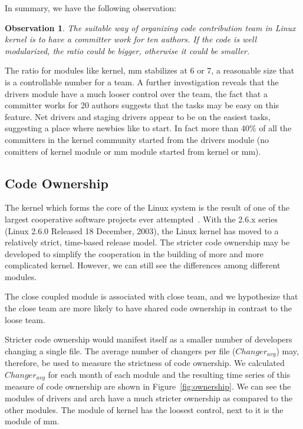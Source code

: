 \documentclass{sig-alternate-05-2015}
\newtheorem{observation}{\bf Observation}
\begin{document}
In summary, we have the following observation:
\begin{observation}\label{o:1}
 The suitable way of organizing code contribution team in Linux kernel is
to have a committer work for ten authors. If the code is well modularized,
the ratio could be bigger, otherwise it could be smaller.
\end{observation}

The ratio for modules like kernel, mm stabilizes at 6 or 7, a reasonable %
size that is a controllable number for a team.
A further investigation reveals that the drivers module have a much looser control over
the team, the fact that a committer works for 20 authors suggests that the tasks
may be easy on this feature. Net drivers and staging drivers appear to be on
the easiest tasks, suggesting a place where newbies like to start.
In fact more than 40\% of all the committers in the kernel community
started from the drivers module (no comitters of kernel module or mm module started from kernel or mm).

\subsection{Code Ownership}
 The kernel which forms the core of the Linux system is the result
of one of the largest cooperative software
projects ever attempted~\cite{kerneldvp}.
With the 2.6.x series (Linux 2.6.0 Released 18 December, 2003), the Linux kernel has moved to a relatively
strict,  time-based  release  model.
The stricter code ownership may be developed to simplify the cooperation
in the building of more and more complicated kernel.
However, we can still see the differences among different modules.

The close coupled module is associated with close team, and we hypothesize
that the close team are more likely to have shared code ownership in contrast
to the loose team.

Stricter code ownership would manifest itself as a smaller number of
developers changing a single file. The average number of changers
per file ($Changer_{avg}$) may, therefore, be used to measure the
strictness of code ownership. We calculated $Changer_{avg}$ for each
month of each module and the resulting time series of this measure of code
ownership are shown in Figure~\ref{fig:ownership}.
We can see the modules of drivers and arch have a much stricter
ownership as compared to the other modules.
The module of kernel has the loosest control, next to it is the module of mm.
\end{document}
